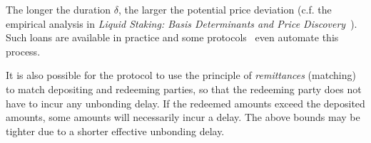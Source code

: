 The longer the duration $\delta$, the larger the potential price deviation
(c.f. the empirical analysis in
\emph{Liquid Staking: Basis Determinants and Price Discovery}~\cite{scharnowski2022liquid}).
Such loans are available in practice and some
protocols~\cite[\S5]{parallel}\cite{marinade-matching} even automate this process.

It is also possible for the protocol to use the principle of \emph{remittances}
(matching)~\cite[\S5]{parallel}\cite{marinade-matching} to match depositing and
redeeming parties, so that the redeeming party does not have to incur any unbonding delay.
If the redeemed amounts exceed the deposited amounts, some amounts will necessarily incur
a delay. The above bounds may be tighter due to
a shorter effective unbonding delay.
